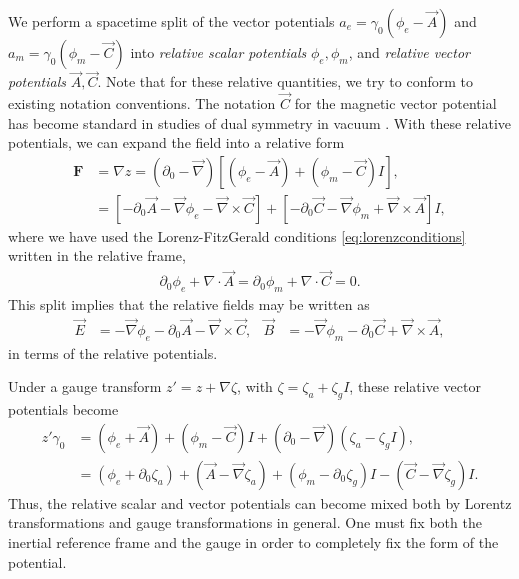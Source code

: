 \documentclass[1p,sort&compress]{elsarticle}
\numberwithin{equation}{section}
\newcommand{\rv}[1]{\vec{#1}}
\newcommand{\bv}[1]{\mathbf{#1}}
\begin{document}
We perform a spacetime split of the vector potentials $a_e = \gamma_0(\phi_e - \rv{A})$ and $a_m = \gamma_0(\phi_m - \rv{C})$ into \emph{relative scalar potentials} $\phi_e,\phi_m$, and \emph{relative vector potentials} $\rv{A},\rv{C}$.  Note that for these relative quantities, we try to conform to existing notation conventions.  The notation $\rv{C}$ for the magnetic vector potential has become standard in studies of dual symmetry in vacuum \cite{Calkin1965,Zwanziger1968,Deser1976,Cameron2012b,Bliokh2013,Cameron2012,Fernandez2013}.  With these relative potentials, we can expand the field into a relative form
\begin{align}
  \bv{F} &= \nabla z = (\partial_0 - \rv{\nabla})[(\phi_e - \rv{A}) + (\phi_m - \rv{C})I], \\
  &= [-\partial_0\rv{A} - \rv{\nabla} \phi_e - \rv{\nabla}\times\rv{C}] + [-\partial_0\rv{C} - \rv{\nabla}\phi_m + \rv{\nabla}\times\rv{A}]I, \nonumber
\end{align}
where we have used the Lorenz-FitzGerald conditions \eqref{eq:lorenzconditions} written in the relative frame, 
\begin{align}
  \partial_0 \phi_e + \nabla\cdot\rv{A} = \partial_0 \phi_m + \nabla\cdot\rv{C} = 0.
\end{align}
This split implies that the relative fields may be written as 
\begin{align}\label{eq:relativepotentials}
  \rv{E} &= -\rv{\nabla} \phi_e - \partial_0\rv{A} - \rv{\nabla}\times\rv{C}, &
  \rv{B} &= -\rv{\nabla} \phi_m - \partial_0\rv{C} + \rv{\nabla}\times\rv{A}, 
\end{align}
in terms of the relative potentials.

Under a gauge transform $z' = z + \nabla\zeta$, with $\zeta = \zeta_a + \zeta_g I$, these relative vector potentials become
\begin{align}\label{eq:gaugetransform}
  z'\gamma_0 &= (\phi_e + \rv{A}) + (\phi_m - \rv{C})I + (\partial_0 - \rv{\nabla})(\zeta_a - \zeta_g I), \\
  &= (\phi_e + \partial_0 \zeta_a) + (\rv{A} - \rv{\nabla}\zeta_a) + (\phi_m - \partial_0 \zeta_g)I - (\rv{C} - \rv{\nabla}\zeta_g)I. \nonumber
\end{align}
Thus, the relative scalar and vector potentials can become mixed both by Lorentz transformations and gauge transformations in general.  One must fix both the inertial reference frame and the gauge in order to completely fix the form of the potential.

\end{document}
